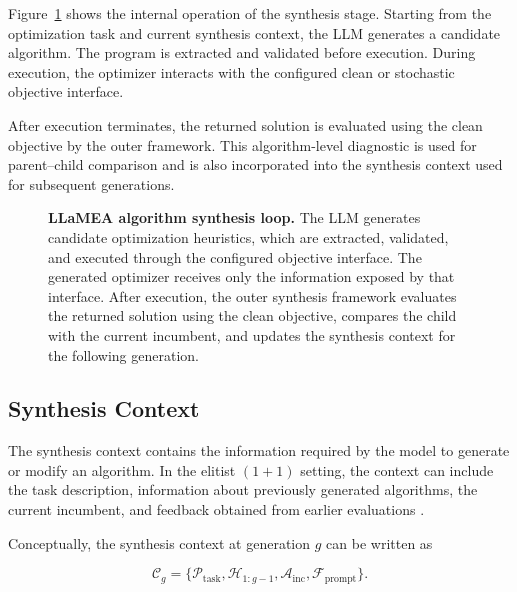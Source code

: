 Figure~\ref{fig:llamea_synthesis_overview} shows the internal operation of the
synthesis stage. Starting from the optimization task and current synthesis
context, the LLM generates a candidate algorithm. The program is extracted
and validated before execution. During execution, the optimizer interacts with
the configured clean or stochastic objective interface.

After execution terminates, the returned solution is evaluated using the clean
objective by the outer framework. This algorithm-level diagnostic is used for
parent--child comparison and is also incorporated into the synthesis context
used for subsequent generations.

\begin{figure}[htbp]
    \centering
    \resizebox{!}{0.9\textheight}{%
        
    }

    \caption[LLaMEA algorithm synthesis loop]{\textbf{LLaMEA algorithm synthesis loop.} The LLM generates candidate optimization heuristics,
    which are extracted, validated, and executed through the configured
    objective interface. The generated optimizer receives only the
    information exposed by that interface. After execution, the outer
    synthesis framework evaluates the returned solution using the clean
    objective, compares the child with the current incumbent, and updates the
    synthesis context for the following generation.}

    \label{fig:llamea_synthesis_overview}
\end{figure}


\subsection{Synthesis Context}
\label{subsec:synthesis_context}

The synthesis context contains the information required by the model to
generate or modify an algorithm. In the elitist $(1+1)$ setting, the context
can include the task description, information about previously generated
algorithms, the current incumbent, and feedback obtained from earlier
evaluations \cite{LLaMEA2024}.

Conceptually, the synthesis context at generation $g$ can be written as

\begin{equation}
\mathcal{C}_g
=
\{
\mathcal{P}_{\mathrm{task}},
\mathcal{H}_{1:g-1},
\mathcal{A}_{\mathrm{inc}},
\mathcal{F}_{\mathrm{prompt}}
\}.
\label{eq:synthesis_context}
\end{equation}

